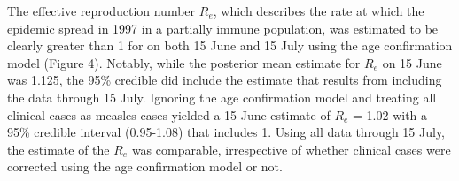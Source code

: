 The effective reproduction number $R_e$, which describes the rate at which the epidemic spread in 1997 in a partially immune population, was estimated to be clearly greater than 1 for on both 15 June and 15 July using the age confirmation model (Figure 4). Notably, while the posterior mean estimate for $R_e$ on 15 June was 1.125, the 95\% credible did include the estimate that results from including the data through 15 July. Ignoring the age
confirmation model and treating all clinical cases as measles cases yielded a 15 June estimate of $R_e$ = 1.02 with a 95\% credible interval
(0.95-1.08) that includes 1. Using all data through 15 July, the estimate of the $R_e$ was comparable, irrespective of whether clinical cases were corrected using the age confirmation model or not.